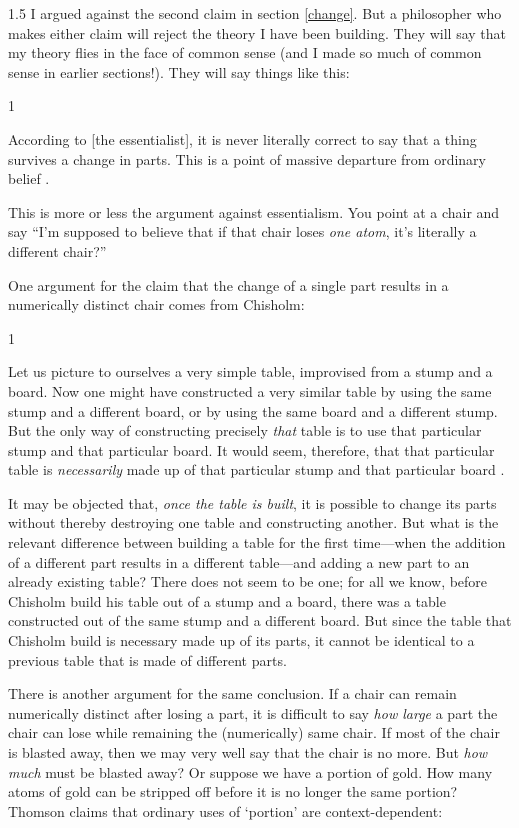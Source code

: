 \documentclass[11pt]{article}
\newenvironment{squote}{%
\begin{spacing}{1}
\begin{list}{}{%
\setlength{\labelwidth}{0pt}%
\rightmargin\leftmargin%
}
\item\relax
}{%
\end{list}%
\end{spacing}
}
\begin{document}
\begin{spacing}{1.5}
I argued against the second claim in section \ref{change}.  But a
philosopher who makes either claim will reject the theory I have been
building.  They will say that my theory flies in the face of common
sense (and I made so much of common sense in earlier sections!).  They
will say things like this:

\begin{squote}
According to [the essentialist], it is never literally correct to say
that a thing survives a change in parts.  This is a point of massive
departure from ordinary belief \citep[184]{sider2001}.
\end{squote}

This is more or less the argument against essentialism.  You point at
a chair and say ``I'm supposed to believe that if that chair loses
{\em one atom}, it's literally a different chair?''

One argument for the claim that the change of a single part results in
a numerically distinct chair comes from Chisholm:

\begin{squote}
Let us picture to ourselves a very simple table, improvised from a
stump and a board.  Now one might have constructed a very similar
table by using the same stump and a different board, or by using the
same board and a different stump.  But the only way of constructing
precisely {\em that} table is to use that particular stump and that
particular board.  It would seem, therefore, that that particular
table is {\em necessarily} made up of that particular stump and that
particular board \citeyearpar[146]{chisholm1979}.
\end{squote}

It may be objected that, {\em once the table is built}, it is possible
to change its parts without thereby destroying one table and
constructing another.  But what is the relevant difference between
building a table for the first time---when the addition of a different
part results in a different table---and adding a new part to an
already existing table?  There does not seem to be one; for all we
know, before Chisholm build his table out of a stump and a board,
there was a table constructed out of the same stump and a different
board.  But since the table that Chisholm build is necessary made up
of its parts, it cannot be identical to a previous table that is made
of different parts.

There is another argument for the same conclusion.  If a chair can
remain numerically distinct after losing a part, it is difficult to
say {\em how large} a part the chair can lose while remaining the
(numerically) same chair.  If most of the chair is blasted away, then
we may very well say that the chair is no more.  But {\em how much}
must be blasted away?  Or suppose we have a portion of gold.  How many
atoms of gold can be stripped off before it is no longer the same
portion?  Thomson claims that ordinary uses of `portion' are
context-dependent:


\end{spacing}
\end{document}
